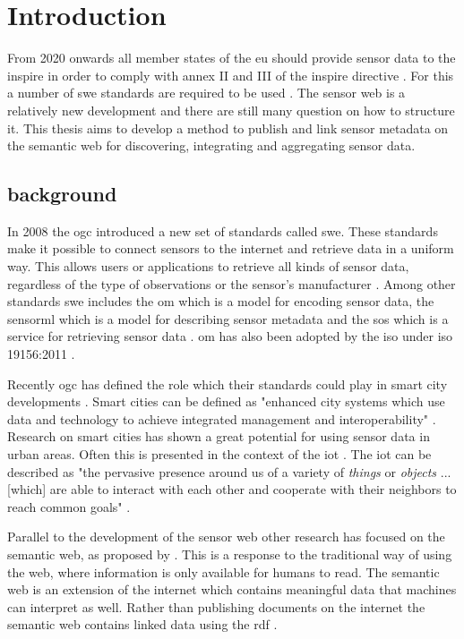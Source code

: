
\chapter{Introduction}
\label{chap:introduction}

From 2020 onwards all member states of the \ac{eu} should provide sensor data to the \ac{inspire} in order to comply with annex II and III of the \ac{inspire} directive \citep{SDI:INSPIRE5}. For this a number of \ac{swe} standards are required to be used \citep{SDI:INSPIRE2}. The sensor web is a relatively new development and there are still many question on how to structure it. This thesis aims to develop a method to publish and link sensor metadata on the semantic web for discovering, integrating and aggregating sensor data.

\section{background}
In 2008 the \ac{ogc} introduced a new set of standards called \ac{swe}. These standards make it possible to connect sensors to the internet and retrieve data in a uniform way. This allows users or applications to retrieve all kinds of sensor data, regardless of the type of observations or the sensor's manufacturer \citep{SW:Botts}. Among other standards \ac{swe} includes the \ac{om} which is a model for encoding sensor data, the \ac{sensorml} which is a model for describing sensor metadata and the \ac{sos} which is a service for retrieving sensor data \citep{SW:OGC}. \ac{om} has also been adopted by the \ac{iso} under \ac{iso} 19156:2011 \cite{SW:ISO}. 

Recently \ac{ogc} has defined the role which their standards could play in smart city developments \citep{SC:OGC}. Smart cities can be defined as "enhanced city systems which use data and technology to achieve integrated management and interoperability" \citep[p. 18]{SC:Moir}. Research on smart cities has shown a great potential for using sensor data in urban areas. Often this is presented in the context of the \ac{iot} \citep{IOT:Zanelli, SSW:Perera}. The \ac{iot} can be described as "the pervasive presence around us of a variety of \textit{things} or \textit{objects} ... [which] are able to interact with each other and cooperate with their neighbors to reach common goals" \cite[p. 2787]{IOT:Atzori}. 

Parallel to the development of the sensor web other research has focused on the semantic web, as proposed by \cite{LD:Berners-lee}. This is a response to the traditional way of using the web, where information is only available for humans to read. The semantic web is an extension of the internet which contains meaningful data that machines can interpret as well. Rather than publishing documents on the internet the semantic web contains linked data using the \ac{rdf} \citep{LD:Bizer}.    

